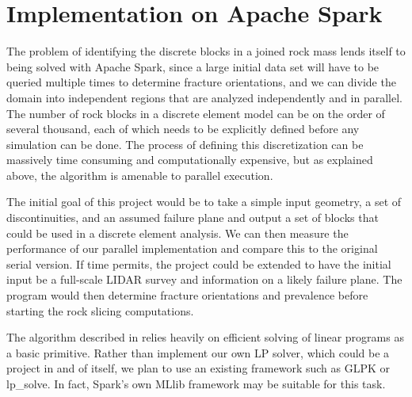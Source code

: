 \documentclass[american]{article}
\begin{document}
\section{Implementation on Apache Spark}
The problem of identifying the discrete blocks in a joined rock mass lends itself to being solved with Apache Spark, since a large initial data set will have to be queried multiple times to determine fracture orientations, and we can divide the domain into independent regions that are analyzed independently and in parallel. The number of rock blocks in a discrete element model can be on the order of  several thousand, each of which needs to be explicitly defined before any simulation can be done. The process of defining this discretization can be massively time consuming and computationally expensive, but as explained above, the algorithm is amenable to parallel execution.

The initial goal of this project would be to take a simple input geometry, a set of discontinuities, and an assumed failure plane and output a set of blocks that could be used in a discrete element analysis. We can then measure the performance of our parallel implementation and compare this to the original serial version. If time permits, the project could be extended to have the initial input be a full-scale LIDAR survey and information on a likely failure plane. The program would then determine fracture orientations and prevalence before starting the rock slicing computations.

The algorithm described in \textcite{Collision} relies heavily on efficient solving of linear programs as a basic primitive. Rather than implement our own LP solver, which could be a project in and of itself, we plan to use an existing framework such as GLPK or lp\_solve. In fact, Spark's own MLlib framework may be suitable for this task.

\nocite{*}
\printbibliography
\end{document}
